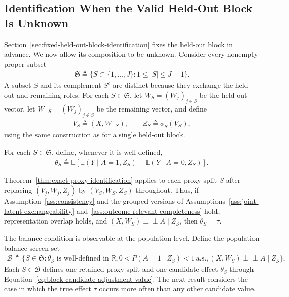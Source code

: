 \subsection{Identification When the Valid Held-Out Block Is Unknown}
\label{sec:unknown-valid-held-out-block}

Section~\ref{sec:fixed-held-out-block-identification} fixes the held-out block in advance. We now allow its composition to be unknown. Consider every nonempty proper subset
\begin{align}
	\mathfrak S \triangleq
	\{S\subset\{1,\ldots,J\}:1\le |S|\le J-1\}.
	\label{eq:all-held-out-orientations}
\end{align}
A subset $S$ and its complement $S^c$ are distinct because they exchange the held-out and remaining roles. For each $S\in\mathfrak S$, let $W_S=(W_j)_{j\in S}$ be the held-out vector, let $W_{-S}=(W_j)_{j\notin S}$ be the remaining vector, and define
\begin{align}
	V_S\triangleq(X,W_{-S}),
	\qquad
	Z_S\triangleq\phi_S(V_S),
	\label{eq:subset-representation}
\end{align}
using the same construction as for a single held-out block.

For each $S\in\mathfrak S$, define, whenever it is well-defined,
\begin{align}
	\theta_S \triangleq \mathbb E\!\left[
	\mathbb E(Y\mid A=1,Z_S)
	-
	\mathbb E(Y\mid A=0,Z_S)
	\right].
	\label{eq:block-candidate-adjustment-value}
\end{align}

Theorem~\ref{thm:exact-proxy-identification} applies to each proxy split $S$ after replacing $(V_j,W_j,Z_j)$ by $(V_S,W_S,Z_S)$ throughout. Thus, if Assumption~\ref{ass:consistency} and the grouped versions of Assumptions~\ref{ass:joint-latent-exchangeability} and~\ref{ass:outcome-relevant-completeness} hold, representation overlap holds, and $(X,W_S)\perp\!\!\!\perp A\mid Z_S$, then $\theta_S=\tau$.

The balance condition is observable at the population level. Define the population balance-screen set
\begin{align}
	\mathcal B
	\triangleq
	\bigl\{S\in\mathfrak S:
	\theta_S\text{ is well-defined in }\mathbb R,
	0<P(A=1\mid Z_S)<1\ \text{a.s.},
	(X,W_S)\perp\!\!\!\perp A\mid Z_S
	\bigr\},
	\label{eq:population-balance-screen}
\end{align}
Each $S\in\mathcal B$ defines one retained proxy split and one candidate effect $\theta_S$ through Equation~\eqref{eq:block-candidate-adjustment-value}. The next result considers the case in which the true effect $\tau$ occurs more often than any other candidate value.


